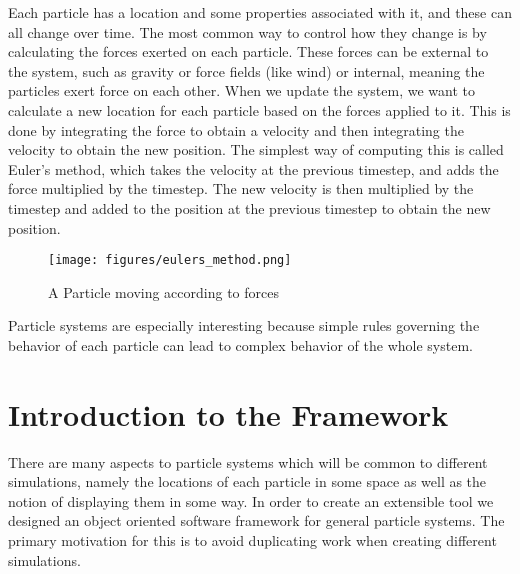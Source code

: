 Each particle has a location and some properties associated with it, and these
can all change over time. The most common way to control how they change is by
calculating the forces exerted on each particle. These forces can be external
to the system, such as gravity or force fields (like wind) or internal, meaning
the particles exert force on each other. When we update the system, we want to
calculate a new location for each particle based on the forces applied to it.
This is done by integrating the force to obtain a velocity and then integrating
the velocity to obtain the new position.
The simplest way of computing this is called Euler's method, which takes the
velocity at the previous timestep, and adds the force multiplied by the
timestep. The new velocity is then multiplied by the timestep and added to the
position at the previous timestep to obtain the new position.
\begin{figure}[!htc]
 		\centering
		\texttt{[image: figures/eulers\_method.png]}
		\label{fig:logic}
        \caption{ A Particle moving according to forces }
\end{figure}


Particle systems are especially interesting because simple rules governing the behavior of
each particle can lead to complex behavior of the whole system. 




\section{Introduction to the Framework}

There are many aspects to particle systems which will be common to different
simulations, namely the locations of each particle in some space as well as the
notion of displaying them in some way. In order to create an extensible tool we
designed an object oriented software framework for general particle systems.
The primary motivation for this is to avoid duplicating work when creating
different simulations.




